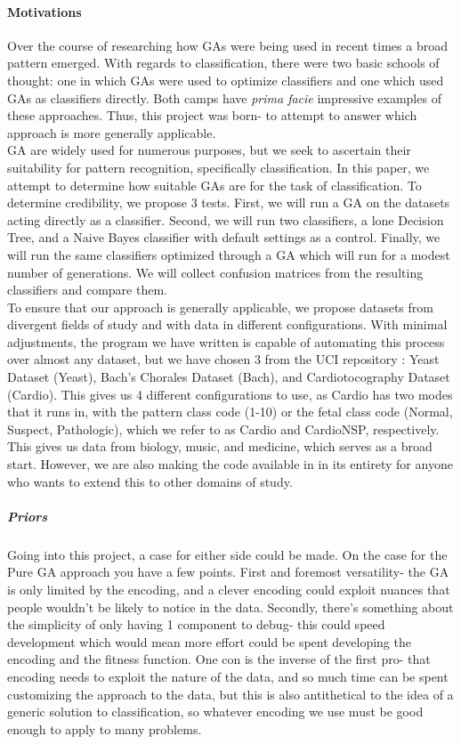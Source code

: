 \paragraph{Motivations}
Over the course of researching how GAs were being used in recent times a broad pattern emerged.  With regards to classification, there were two basic schools of thought:  one in which GAs were used to optimize classifiers and one which used GAs as classifiers directly.  Both camps have \textit{prima facie} impressive examples of these approaches.  Thus, this project was born- to attempt to answer which approach is more generally applicable.\\
GA are widely used for numerous purposes, but we seek to ascertain their suitability for pattern recognition, specifically classification.  In this paper, we attempt to determine how suitable GAs are for the task of classification.  To determine credibility, we propose 3 tests.  First, we will run a GA on the datasets acting directly as a classifier.  Second, we will run two classifiers, a lone Decision Tree, and a Naive Bayes classifier with default settings as a control.  Finally, we will run the same classifiers optimized through a GA which will run for a modest number of generations.  We will collect confusion matrices from the resulting classifiers and compare them.\\
To ensure that our approach is generally applicable, we propose datasets from divergent fields of study and with data in different configurations.  With minimal adjustments, the program we have written is capable of automating this process over almost any dataset, but we have chosen 3 from the UCI repository\citep{lichman_uci_2013} : Yeast Dataset (Yeast)\citep{paul_horton_uci_1996}, Bach's Chorales Dataset (Bach)\citep{daniele_p._radicioni_uci_2014}, and Cardiotocography Dataset (Cardio)\citep{j._p._marques_de_sa_uci_2010}.  This gives us 4 different configurations to use, as Cardio has two modes that it runs in, with the pattern class code (1-10) or the fetal class code (Normal, Suspect, Pathologic), which we refer to as Cardio and CardioNSP, respectively.  This gives us data from biology, music, and medicine, which serves as a broad start.  However, we are also making the code available in in its entirety for anyone who wants to extend this to other domains of study.\\
\subparagraph{Priors}
Going into this project, a case for either side could be made.  On the case for the Pure GA approach you have a few points.  First and foremost versatility- the GA is only limited by the encoding, and a clever encoding could exploit nuances that people wouldn't be likely to notice in the data.  Secondly, there's something about the simplicity of only having 1 component to debug- this could speed development which would mean more effort could be spent developing the encoding and the fitness function.  One con is the inverse of the first pro- that encoding needs to exploit the nature of the data, and so much time can be spent customizing the approach to the data, but this is also antithetical to the idea of a generic solution to classification, so whatever encoding we use must be good enough to apply to many problems.\\
